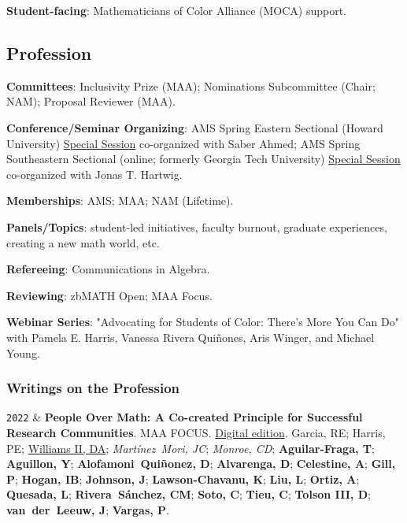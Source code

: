\documentclass[11pt]{article}
\newcommand{\LastName}{Williams II}
\newcommand{\Initials}{DA}
\newcommand{\Me}{\underline{\LastName, \Initials}}  %
\newcommand{\PEH}{Harris, PE}
\newcommand{\Rebecca}{Garcia, RE}
\newcommand{\Yasmin}{Aguillon, Y}
\newcommand{\Dylan}{Alvarenga, D}
\newcommand{\Carlos}{Mart\'{i}nez~Mori, JC}
\newcommand{\Cas}{Monroe, CD}
\newcommand{\Camelle}{Tieu, C}
\newcommand{\Imhotep}{Hogan, IB}
\newcommand{\Tomas}{Aguilar-Fraga, T}
\newcommand{\Daniel}{Alofamoni~Quiñonez, D}
\newcommand{\Aalliyah}{Celestine, A}
\newcommand{\Parneet}{Gill, P}
\newcommand{\Jakeyl}{Johnson, J}
\newcommand{\Kobe}{Lawson-Chavanu, K}
\newcommand{\Lina}{Liu, L}
\newcommand{\Aaron}{Ortiz, A}
\newcommand{\Lauren}{Quesada, L}
\newcommand{\Cynthia}{Rivera~Sánchez, CM}
\newcommand{\Christopher}{Soto, C}
\newcommand{\Dirk}{Tolson III, D}
\newcommand{\Jacob}{van~der~Leeuw, J}
\newcommand{\Pamela}{Vargas, P}
\newcommand{\UGCollab}[1]{\textbf{#1}}
\newcommand{\GradCollab}[1]{\textit{#1}}
\newcommand{\Year}[1]{\fontsize{10pt}{0}\selectfont \texttt{#1}}
\begin{document}
\textbf{Student-facing}:  Mathematicians of Color Alliance (MOCA) support.
\subsection{Profession}
\textbf{Committees}: Inclusivity Prize (MAA); Nominations Subcommittee (Chair; NAM); Proposal Reviewer (MAA).

\textbf{Conference/Seminar Organizing}: AMS Spring Eastern Sectional (Howard University) \href{https://www.ams.org/meetings/sectional/2312\_program\_ss15.html\#title}{Special Session} co-organized with Saber Ahmed; AMS Spring Southeastern Sectional (online; formerly Georgia Tech University) \href{https://www.ams.org/meetings/sectional/2287_program_ss13.html}{Special Session} co-organized with Jonas T. Hartwig.

\textbf{Memberships}: AMS; MAA; NAM (Lifetime).

\textbf{Panels/Topics}: student-led initiatives, faculty burnout, graduate experiences, creating a new math world, etc.

\textbf{Refereeing}: Communications in Algebra.

\textbf{Reviewing}: zbMATH Open; MAA Focus.

\textbf{Webinar Series}: "Advocating for Students of Color: There's More You Can Do" with Pamela E. Harris, Vanessa Rivera Quiñones, Aris Winger, and Michael Young.
    \subsubsection{Writings on the Profession}
\begin{EntriesTableYear}
 \Year{2022}  &
  \textbf{People Over Math: A Co-created Principle for Successful Research Communities}.
  \newline
  MAA FOCUS. \href{http://digitaleditions.walsworthprintgroup.com/publication/?m=7656\&i=749450\&p=26\&fbclid=IwAR19q6M4ZQ1I8uncyU-iuGHsHfz-6JHFiZFHrg9thmyGqXAESJYRlaHXijc\&ver=html5}{Digital edition}.
  \newline
  \Rebecca; \PEH; \Me; \GradCollab{\Carlos}; \GradCollab{\Cas}; \UGCollab{\Tomas}; \UGCollab{\Yasmin}; \UGCollab{\Daniel}; \UGCollab{\Dylan}; \UGCollab{\Aalliyah}; \UGCollab{\Parneet}; \UGCollab{\Imhotep}; \UGCollab{\Jakeyl}; \UGCollab{\Kobe}; \UGCollab{\Lina}; \UGCollab{\Aaron}; \UGCollab{\Lauren}; \UGCollab{\Cynthia}; \UGCollab{\Christopher}; \UGCollab{\Camelle}; \UGCollab{\Dirk}; \UGCollab{\Jacob}; \UGCollab{\Pamela}.
\end{EntriesTableYear}
\end{document}
